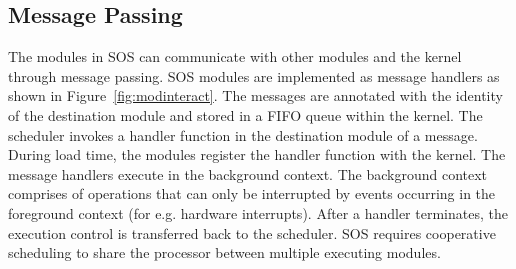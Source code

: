 \subsection{Message Passing}
%
The modules in SOS can communicate with other modules and the kernel
through message passing.
%
SOS modules are implemented as message handlers as shown in
Figure~\ref{fig:modinteract}.
%
The messages are annotated with the identity of the destination module
and stored in a FIFO queue within the kernel.
%
The scheduler invokes a handler function in the destination module of
a message.
%
During load time, the modules register the handler function with
the kernel.
%
%
The message handlers execute in the background context.
%
The background context comprises of operations that can only be
interrupted by events occurring in the foreground context (for
e.g. hardware interrupts).
%
%
After a handler terminates, the execution control is transferred back
to the scheduler.
%
SOS requires cooperative scheduling to share the processor between
multiple executing modules.
%
